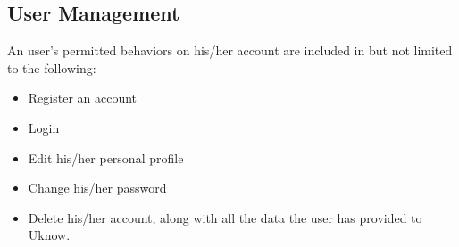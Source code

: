 
\subsection{User Management}

An user's permitted behaviors on his/her account are included in but not
limited to the following:

\begin{itemize}
\itemsep1pt\parskip0pt
\item
  Register an account
\item
  Login
\item
  Edit his/her personal profile
\item
  Change his/her password
\item
  Delete his/her account, along with all the data the user has provided
  to Uknow.
\end{itemize}
